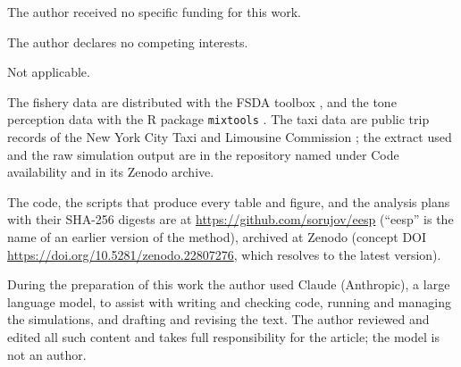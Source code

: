  The author received no specific funding for this work.

 The author declares no competing interests.

 Not applicable.

 The fishery data are distributed with the FSDA toolbox
\citep{riani2012fsda}, and the tone perception data with the R package \texttt{mixtools}
\citep{benaglia2009mixtools}. The taxi data are public trip records of the New York City Taxi
and Limousine Commission \citep{tlc2024trip}; the extract used and the raw simulation output are
in the repository named under Code availability and in its Zenodo archive.

 The code, the scripts that produce every table and figure, and the
analysis plans with their SHA-256 digests are at \url{https://github.com/sorujov/eesp}
(``eesp'' is the name of an earlier version of the method), archived at Zenodo
(concept DOI \url{https://doi.org/10.5281/zenodo.22807276}, which resolves to the latest version).

 During the preparation of this work the author used
Claude (Anthropic), a large language model, to assist with writing and checking code, running
and managing the simulations, and drafting and revising the text. The author reviewed and
edited all such content and takes full responsibility for the article; the model is not an
author.

